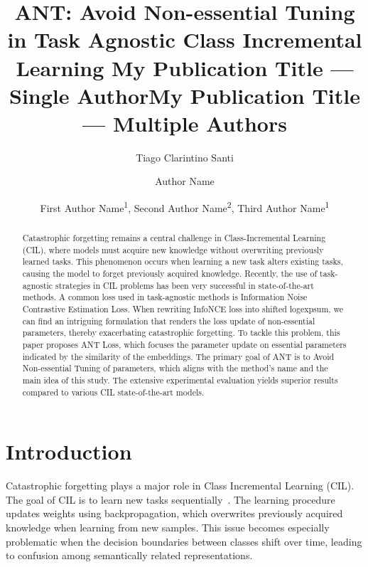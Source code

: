 \documentclass[letterpaper]{article} %
\title{ANT: Avoid Non-essential Tuning in Task Agnostic Class Incremental Learning }
\author{
    Tiago Clarintino Santi
}
\title{My Publication Title --- Single Author}
\author {
    Author Name
}
\title{My Publication Title --- Multiple Authors}
\author {
    First Author Name\textsuperscript{\rm 1},
    Second Author Name\textsuperscript{\rm 2},
    Third Author Name\textsuperscript{\rm 1}
}
\begin{document}
\maketitle

\begin{abstract}
Catastrophic forgetting remains a central challenge in Class-Incremental Learning (CIL), where models must acquire new knowledge without overwriting previously learned tasks. This phenomenon occurs when learning a new task alters existing tasks, causing the model to forget previously acquired knowledge. Recently, the use of task-agnostic strategies in CIL problems has been very successful in state-of-the-art methods. A common loss used in task-agnostic methods is Information Noise Contrastive Estimation Loss. When rewriting InfoNCE loss into shifted logexpsum, we can find an intriguing formulation that renders the loss update of non-essential parameters, thereby exacerbating catastrophic forgetting. To tackle this problem, this paper proposes ANT Loss, which focuses the parameter update on essential parameters indicated by the similarity of the embeddings. The primary goal of ANT is to Avoid Non-essential Tuning of parameters, which aligns with the method's name and the main idea of this study. The extensive experimental evaluation yields superior results compared to various CIL state-of-the-art models.
\end{abstract}


\section{Introduction}



Catastrophic forgetting plays a major role in Class Incremental Learning (CIL). The goal of CIL is to learn new tasks sequentially~\cite{wang2024comprehensive,de2021continual}. The learning procedure updates weights using backpropagation, which overwrites previously acquired knowledge when learning from new samples. This issue becomes especially problematic when the decision boundaries between classes shift over time, leading to confusion among semantically related representations.
\end{document}
